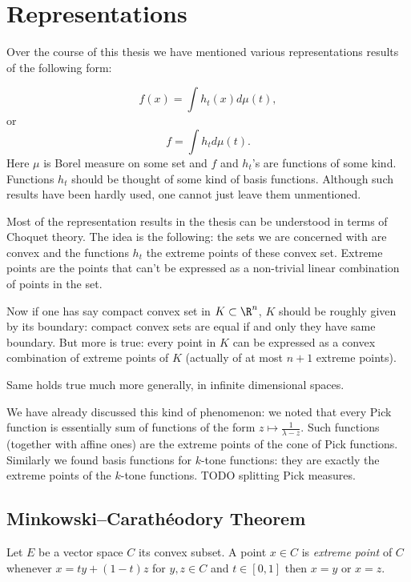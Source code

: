 \chapter{Representations}

Over the course of this thesis we have mentioned various representations results of the following form:

\[
f(x) = \int h_{t}(x) d \mu (t),
\]
or
\[
f = \int h_{t} d \mu(t).
\]
Here $\mu$ is Borel measure on some set and $f$ and $h_{t}$'s are functions of some kind. Functions $h_{t}$ should be thought of some kind of basis functions. Although such results have been hardly used, one cannot just leave them unmentioned.

Most of the representation results in the thesis can be understood in terms of Choquet theory. The idea is the following: the sets we are concerned with are convex and the functions $h_{t}$ the extreme points of these convex set. Extreme points are the points that can't be expressed as a non-trivial linear combination of points in the set.

Now if one has say compact convex set in $K \subset \R^{n}$, $K$ should be roughly given by its boundary: compact convex sets are equal if and only they have same boundary. But more is true: every point in $K$ can be expressed as a convex combination of extreme points of $K$ (actually of at most $n + 1$ extreme points).

Same holds true much more generally, in infinite dimensional spaces.

We have already discussed this kind of phenomenon: we noted that every Pick function is essentially sum of functions of the form $z \mapsto \frac{1}{\lambda - z}$. Such functions (together with affine ones) are the extreme points of the cone of Pick functions. Similarly we found basis functions for $k$-tone functions: they are exactly the extreme points of the $k$-tone functions. TODO splitting Pick measures.

\section{Minkowski–Carath\'{e}odory Theorem}

\begin{maar}
	Let $E$ be a vector space $C$ its convex subset. A point $x \in C$ is \textit{extreme point} of $C$ whenever $x = t y + (1 - t) z$ for $y, z \in C$ and $t \in [0, 1]$ then $x = y$ or $x = z$.
\end{maar}

